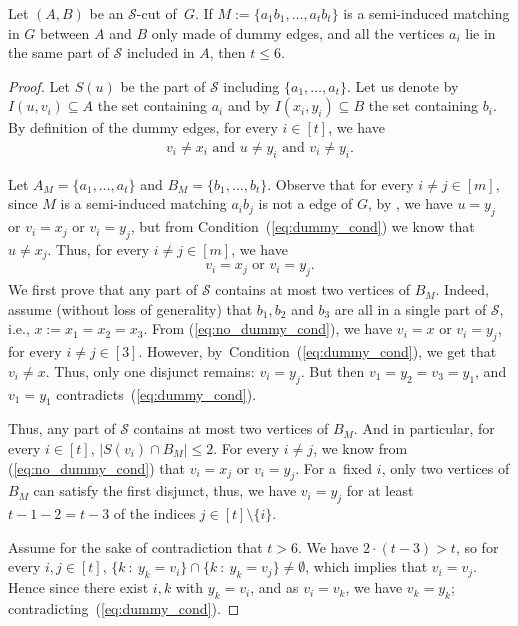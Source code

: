 \documentclass[a4paper,UKenglish,cleveref,hyperref,autoref]{lipics-v2021}
\renewcommand{\leq}{\leqslant}
\renewcommand{\le}{\leq}
\begin{document}
\begin{lemma}\label{lem:white-edges-restriction}
  Let $(A, B)$ be an $\mathcal S$-cut of~$G$.
  If $M := \{a_1b_1, \dots, a_tb_t\}$ is a semi-induced matching in $G$ between $A$ and $B$ only made of dummy edges, and all the vertices $a_i$ lie in the same part of $\mathcal S$ included in $A$, then $t \leqslant 6$.
\end{lemma}
\begin{proof}
  Let $S(u)$ be the part of $\mathcal S$ including $\{a_1, \ldots, a_t\}$.
  Let us denote by $I(u, v_i) \subseteq A$ the set containing $a_i$ and by $I(x_i, y_i) \subseteq B$ the set containing $b_i$.
  By definition of the dummy edges, for every $i \in [t]$,  we have
  \begin{align}\label{eq:dummy_cond}
    v_i \neq x_i \text{ and } u \neq y_i \text{ and }v_i \neq y_i.
  \end{align}
  
  Let $A_M = \{a_1,\dots,a_t\}$ and $B_M = \{b_1,\dots,b_t\}$.
  Observe that for every $i\neq j \in [m]$, since $M$ is a semi-induced matching $a_ib_j$ is not a edge of $G$, by , we have 
  $u = y_j$ or $v_i = x_j$ or $v_i = y_j$, but from  Condition~(\ref{eq:dummy_cond}) we know that $u\neq x_j$.
  Thus, for every $i\neq j \in [m]$, we have
  \begin{align}\label{eq:no_dummy_cond}
  	v_i = x_j \text{ or } v_i = y_j.  
  \end{align}
  We first prove that any part of $\mathcal S$ contains at most two vertices of $B_M$.
  Indeed, assume (without loss of generality) that $b_1, b_2$ and $b_3$ are all in a single part of $\mathcal S$, i.e., $x := x_1 = x_2 = x_3$.
  From (\ref{eq:no_dummy_cond}), we have $v_i = x$ or $v_i = y_j$, for every $i\neq j \in [3]$.
  However, by~Condition~(\ref{eq:dummy_cond}), we get that $v_i \neq x$.
  Thus, only one disjunct remains: $v_i = y_j$.
  But then $v_1 = y_2 = v_3 = y_1$, and $v_1 = y_1$ contradicts~(\ref{eq:dummy_cond}).
  
  Thus, any part of $\mathcal S$ contains at most two vertices of $B_M$.
  And in particular, for every $i \in [t]$, $|S(v_i) \cap B_M| \le 2$.
  For every $i \neq j$, we know from (\ref{eq:no_dummy_cond}) that $v_i = x_j$ or $v_i = y_j$.
  For a~fixed $i$, only two vertices of $B_M$ can satisfy the first disjunct, thus, we have $v_i = y_j$ for at least $t - 1 - 2 = t - 3$ of the indices $j \in [t] \setminus \{i\}$.
  
  Assume for the sake of contradiction that $t > 6$.
  We have $2 \cdot (t-3) > t$, so for every $i, j \in [t]$, $\{k ~:~ y_k = v_i\} \cap \{k ~:~ y_k = v_j\} \neq \emptyset$, which implies that $v_i = v_j$.
  Hence since there exist $i, k$ with $y_k = v_i$, and as $v_i = v_k$, we have $v_k = y_k$; contradicting~(\ref{eq:dummy_cond}).
\end{proof}
\end{document}
